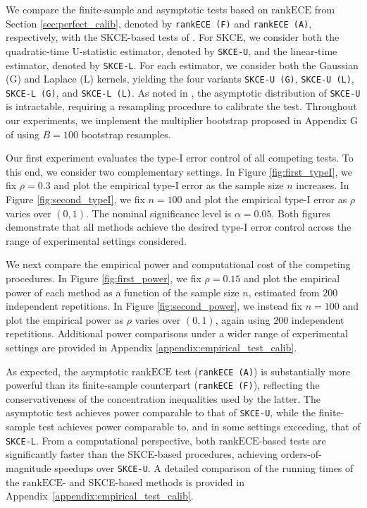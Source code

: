\documentclass[11pt]{article}
\numberwithin{equation}{section}
\theoremstyle{definition}
\newcommand{\rankECE}{\mathrm{rankECE}}
\begin{document}
We compare the finite-sample and asymptotic tests based on $\rankECE$ from Section \ref{sec:perfect_calib}, denoted by \texttt{rankECE (F)} and \texttt{rankECE (A)}, respectively, with the SKCE-based tests of \cite{widmann2019calibration}. For SKCE, we consider both the quadratic-time U-statistic estimator, denoted by \texttt{SKCE-U}, and the linear-time estimator, denoted by \texttt{SKCE-L}. For each estimator, we consider both the Gaussian (G) and Laplace (L) kernels, yielding the four variants \texttt{SKCE-U (G)}, \texttt{SKCE-U (L)}, \texttt{SKCE-L (G)}, and \texttt{SKCE-L (L)}. As noted in \cite{widmann2019calibration}, the asymptotic distribution of \texttt{SKCE-U} is intractable, requiring a resampling procedure to calibrate the test. Throughout our experiments, we implement the multiplier bootstrap proposed in Appendix G of \cite{widmann2019calibration} using $B = 100$ bootstrap resamples.

Our first experiment evaluates the type-I error control of all competing tests. To this end, we consider two complementary settings. In Figure \ref{fig:first_typeI}, we fix $\rho = 0.3$ and plot the empirical type-I error as the sample size $n$ increases. In Figure \ref{fig:second_typeI}, we fix $n = 100$ and plot the empirical type-I error as $\rho$ varies over $(0,1)$. The nominal significance level is $\alpha = 0.05$. Both figures demonstrate that all methods achieve the desired type-I error control across the range of experimental settings considered.

We next compare the empirical power and computational cost of the competing procedures. In Figure \ref{fig:first_power}, we fix $\rho = 0.15$ and plot the empirical power of each method as a function of the sample size $n$, estimated from $200$ independent repetitions. In Figure \ref{fig:second_power}, we instead fix $n = 100$ and plot the empirical power as $\rho$ varies over $(0,1)$, again using $200$ independent repetitions. Additional power comparisons under a wider range of experimental settings are provided in Appendix \ref{appendix:empirical_test_calib}. 

As expected, the asymptotic $\rankECE$ test (\texttt{rankECE (A)}) is substantially more powerful than its finite-sample counterpart (\texttt{rankECE (F)}), reflecting the conservativeness of the concentration inequalities used by the latter. The asymptotic test achieves power comparable to that of \texttt{SKCE-U}, while the finite-sample test achieves power comparable to, and in some settings exceeding, that of \texttt{SKCE-L}. From a computational perspective, both $\rankECE$-based tests are significantly faster than the SKCE-based procedures, achieving orders-of-magnitude speedups over \texttt{SKCE-U}. A detailed comparison of the running times of the $\rankECE$- and SKCE-based methods is provided in Appendix~\ref{appendix:empirical_test_calib}.
\end{document}
